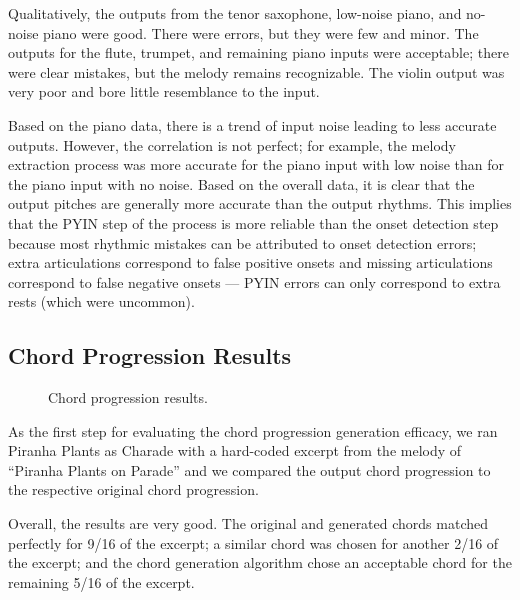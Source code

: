 Qualitatively, the outputs from the tenor saxophone, low-noise piano, and no-noise piano were good. There were errors, but they were few and minor. The outputs for the flute, trumpet, and remaining piano inputs were acceptable; there were clear mistakes, but the melody remains recognizable. The violin output was very poor and bore little resemblance to the input.

Based on the piano data, there is a trend of input noise leading to less accurate outputs. However, the correlation is not perfect; for example, the melody extraction process was more accurate for the piano input with low noise than for the piano input with no noise. Based on the overall data, it is clear that the output pitches are generally more accurate than the output rhythms. This implies that the PYIN step of the process is more reliable than the onset detection step because most rhythmic mistakes can be attributed to onset detection errors; extra articulations correspond to false positive onsets and missing articulations correspond to false negative onsets --- PYIN errors can only correspond to extra rests (which were uncommon).

\subsection{Chord Progression Results}
\label{sec:chord_progression_results}

\begin{figure}
    \resizebox{\linewidth}{!}{}
    \caption{Chord progression results.}
    \label{fig:chord_progression_pie}
\end{figure}
As the first step for evaluating the chord progression generation efficacy, we ran Piranha Plants as Charade with a hard-coded excerpt from the melody of ``Piranha Plants on Parade'' and we compared the output chord progression to the respective original chord progression.

Overall, the results are very good. The original and generated chords matched perfectly for 9/16 of the excerpt; a similar chord was chosen for another 2/16 of the excerpt; and the chord generation algorithm chose an acceptable chord for the remaining 5/16 of the excerpt.


